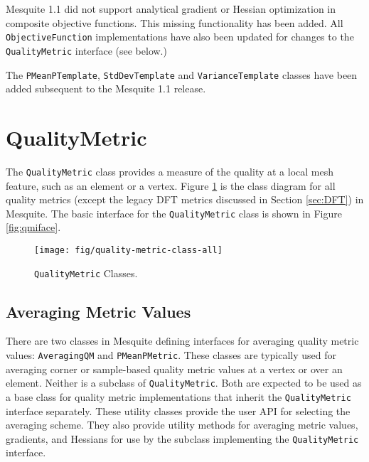 \documentclass{article}
\begin{document}
Mesquite 1.1 did not support analytical gradient or Hessian optimization in composite objective functions.  This missing functionality has been added.  All \texttt{ObjectiveFunction} implementations have also been updated for changes to the \texttt{QualityMetric} interface (see below.)

The \texttt{PMeanPTemplate}, \texttt{StdDevTemplate} and \texttt{VarianceTemplate} classes have been added subsequent to the Mesquite 1.1 release.


\section{QualityMetric}

The \texttt{QualityMetric} class provides a measure of the quality at a local mesh feature, such as an element or a vertex.  Figure \ref{fig:qmclass} is the class diagram for all quality metrics (except the legacy DFT metrics discussed in Section \ref{sec:DFT}) in Mesquite.  The basic interface for the \texttt{QualityMetric} class is shown in Figure \ref{fig:qmiface}. 


\begin{figure}[p]
\begin{smallmargins}
\texttt{[image: fig/quality-metric-class-all]}
\caption{\texttt{QualityMetric} Classes.\label{fig:qmclass}}
\end{smallmargins}
\end{figure}


\subsection{Averaging Metric Values}

\label{sec:qmaverage}

There are two classes in Mesquite defining interfaces for averaging quality metric values: \texttt{AveragingQM} and \texttt{PMeanPMetric}.  These classes are typically used for averaging corner or sample-based quality metric values at a vertex or over an element.  Neither is a subclass of \texttt{QualityMetric}.  Both are expected to be used as a base class for quality metric implementations that inherit the \texttt{QualityMetric} interface separately.  These utility classes provide the user API for selecting the averaging scheme.  They also provide utility methods for averaging metric values, gradients, and Hessians for use by the subclass implementing the \texttt{QualityMetric} interface.
\end{document}
